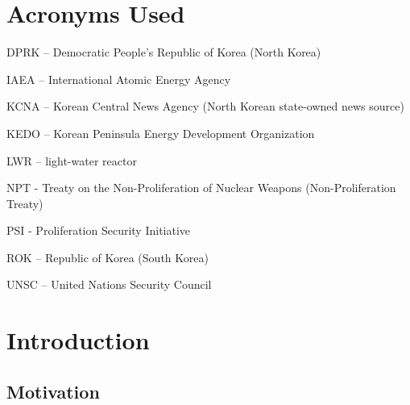 \documentclass{article}
\begin{document}
%    
%    
%

\tableofcontents

\pagebreak

\section{Acronyms Used}

DPRK – Democratic People’s Republic of Korea (North Korea)

\noindent IAEA – International Atomic Energy Agency

\noindent KCNA – Korean Central News Agency (North Korean state-owned news source)

\noindent KEDO – Korean Peninsula Energy Development Organization

\noindent LWR – light-water reactor

\noindent NPT - Treaty on the Non-Proliferation of Nuclear Weapons (Non-Proliferation Treaty)

\noindent PSI - Proliferation Security Initiative

\noindent ROK – Republic of Korea (South Korea)

\noindent UNSC – United Nations Security Council

\section{Introduction}

\subsection{Motivation}
\end{document}
